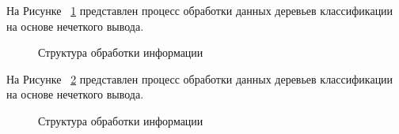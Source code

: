 На Рисунке ~\cref{fig:NNprocess2} представлен процесс обработки данных деревьев классификации на основе нечеткого вывода. 
\begin{figure}[ht]
    \caption{Структура обработки информации}\label{fig:NNprocess2}
\end{figure}
На Рисунке ~\cref{fig:NNprocess3} представлен процесс обработки данных деревьев классификации на основе нечеткого вывода. 
\begin{figure}[ht]
    \caption{Структура обработки информации}\label{fig:NNprocess3}
\end{figure}

